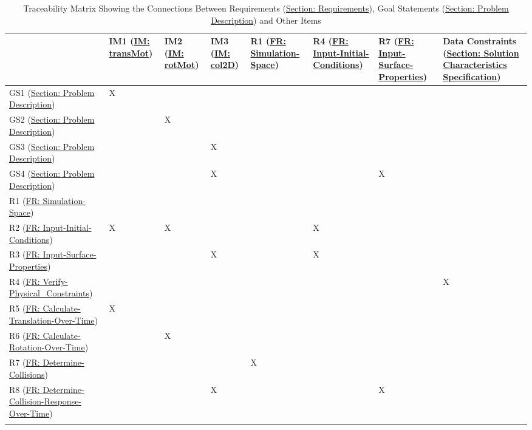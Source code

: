 \documentclass[12pt]{article}
\begin{document}
\begin{longtable}{l l l l l l l l}
\toprule
 & IM1 (\hyperref[IM:transMot]{IM: transMot}) & IM2 (\hyperref[IM:rotMot]{IM: rotMot}) & IM3 (\hyperref[IM:col2D]{IM: col2D}) & R1 (\hyperref[reqSS]{FR: Simulation-Space}) & R4 (\hyperref[reqIIC]{FR: Input-Initial-Conditions}) & R7 (\hyperref[reqISP]{FR: Input-Surface-Properties}) & Data Constraints (\hyperref[Sec:SolCharSpec]{Section: Solution Characteristics Specification})
\\
\midrule
GS1 (\hyperref[Sec:ProbDesc]{Section: Problem Description}) & X &  &  &  &  &  & 
\\
GS2 (\hyperref[Sec:ProbDesc]{Section: Problem Description}) &  & X &  &  &  &  & 
\\
GS3 (\hyperref[Sec:ProbDesc]{Section: Problem Description}) &  &  & X &  &  &  & 
\\
GS4 (\hyperref[Sec:ProbDesc]{Section: Problem Description}) &  &  & X &  &  & X & 
\\
R1 (\hyperref[reqSS]{FR: Simulation-Space}) &  &  &  &  &  &  & 
\\
R2 (\hyperref[reqIIC]{FR: Input-Initial-Conditions}) & X & X &  &  & X &  & 
\\
R3 (\hyperref[reqISP]{FR: Input-Surface-Properties}) &  &  & X &  & X &  & 
\\
R4 (\hyperref[reqVPC]{FR: Verify-Physical\_Constraints}) &  &  &  &  &  &  & X
\\
R5 (\hyperref[reqCTOT]{FR: Calculate-Translation-Over-Time}) & X &  &  &  &  &  & 
\\
R6 (\hyperref[reqCROT]{FR: Calculate-Rotation-Over-Time}) &  & X &  &  &  &  & 
\\
R7 (\hyperref[reqDC]{FR: Determine-Collisions}) &  &  &  & X &  &  & 
\\
R8 (\hyperref[reqDCROT]{FR: Determine-Collision-Response-Over-Time}) &  &  & X &  &  & X & 
\\
\bottomrule
\caption{Traceability Matrix Showing the Connections Between Requirements (\hyperref[Sec:Requirements]{Section: Requirements}), Goal Statements (\hyperref[Sec:ProbDesc]{Section: Problem Description}) and Other Items}
\label{Table:TraceyReqGoalsOther}
\end{longtable}
\end{document}
